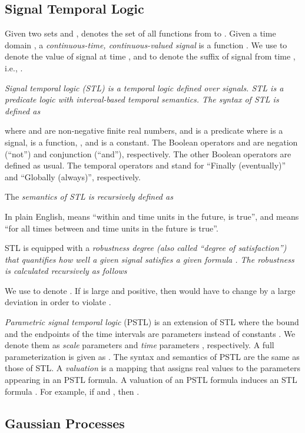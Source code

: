 \documentclass[10pt]{article}
\theoremstyle{plain}
\begin{document}
\subsection{Signal Temporal Logic}
\label{sec:STL}
Given two sets  and ,  denotes the set of all functions from  to . Given a time domain , a \emph{continuous-time, continuous-valued signal} is a function . We use  to denote the value of signal  at time , and  to denote the suffix of signal  from time , i.e., .  

\em Signal temporal logic \em (STL) \cite{maler2004monitoring} is a temporal logic defined over signals.  STL is a predicate logic with interval-based temporal semantics. The  syntax of STL is defined as

where  and  are non-negative finite real numbers, and   is a predicate where  is a signal,  is a function, , and  is a constant. The Boolean operators  and  are negation (``not'') and conjunction (``and''), respectively. The other Boolean operators are defined as usual. The temporal operators  and  stand for ``Finally (eventually)'' and ``Globally (always)'', respectively. 


The \em semantics \em of STL is recursively defined as

In plain English,  means ``within  and  time units in the future,  is true'', and  means ``for all times between  and  time units in the future  is true''.

STL is equipped with a \em robustness degree \em 
\cite{fainekos2009robustness,donze2010robust} (also called ``degree of 
satisfaction'') that quantifies how well a given signal  satisfies a given formula .  The robustness is calculated recursively as follows
 
We use  to denote . If  is large and positive, then  would have to change by a large deviation in order to violate .  

\emph{Parametric signal temporal logic} (PSTL) is an extension of STL where the bound  and the endpoints of the time intervals  are parameters instead of constants \cite{asarin2012parametric}. We denote them as \emph{scale} parameters  and \emph{time} parameters , respectively. A full parameterization is given as . The syntax and semantics of PSTL are the same as those of STL. A \emph{valuation}  is a mapping that assigns real values to the parameters appearing in an PSTL formula. A valuation  of an PSTL formula  induces an STL formula . For example, if  and , then .

\subsection{Gaussian Processes}
\label{sec:GP}
\end{document}
